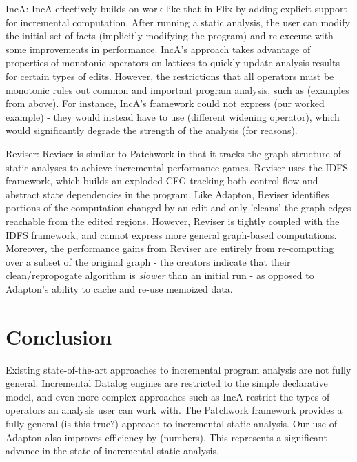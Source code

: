 \documentclass[acmlarge,anonymous]{acmart}\settopmatter{printfolios=true}
\begin{document}
IncA: IncA effectively builds on work like that in Flix by adding explicit support for incremental computation. After running a static analysis, the user can modify the initial set of facts (implicitly modifying the program) and re-execute with some improvements in performance. IncA's approach takes advantage of properties of monotonic operators on lattices to quickly update analysis results for certain types of edits. However, the restrictions that all operators must be monotonic rules out common and important program analysis, such as (examples from above). For instance, IncA's framework could not express (our worked example) - they would instead have to use (different widening operator), which would significantly degrade the strength of the analysis (for reasons).

Reviser: Reviser is similar to Patchwork in that it tracks the graph structure of static analyses to achieve incremental performance games. Reviser uses the IDFS framework, which builds an exploded CFG tracking both control flow and abstract state dependencies in the program. Like Adapton, Reviser identifies portions of the computation changed by an edit and only 'cleans' the graph edges reachable from the edited regions. However, Reviser is tightly coupled with the IDFS framework, and cannot express more general graph-based computations. Moreover, the performance gains from Reviser are entirely from re-computing over a subset of the original graph - the creators indicate that their clean/repropogate algorithm is \textit{slower} than an initial run - as opposed to Adapton's ability to cache and re-use memoized data.

\section{Conclusion}

Existing state-of-the-art approaches to incremental program analysis are not fully general. Incremental Datalog engines are restricted to the simple declarative model, and even more complex approaches such as IncA restrict the types of operators an analysis user can work with. The Patchwork framework provides a fully general (is this true?) approach to incremental static analysis. Our use of Adapton also improves efficiency by (numbers). This represents a significant advance in the state of incremental static analysis.
\end{document}
